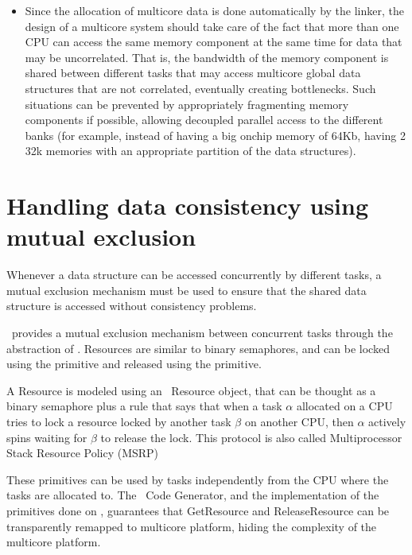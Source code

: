 \begin{itemize}
\item Since the allocation of multicore data is done
  automatically by the linker, the design of a multicore system
  should take care of the fact that more than one CPU can access the
  same memory component at the same time for data that may be
  uncorrelated. That is, the bandwidth of the memory component is
  shared between different tasks that may access multicore global
  data structures that are not correlated, eventually creating
  bottlenecks.  Such situations can be prevented by appropriately
  fragmenting memory components if possible, allowing decoupled
  parallel access to the different banks (for example, instead of
  having a big onchip memory of 64Kb, having 2 32k memories with an
  appropriate partition of the data structures).
\end{itemize}





\section{Handling data consistency using mutual exclusion}
\label{sec:altera-mutex}

Whenever a data structure can be accessed concurrently by different
tasks, a mutual exclusion mechanism must be used to ensure that the
shared data structure is accessed without consistency problems.

\ee\ provides a mutual exclusion mechanism between concurrent tasks
through the abstraction of . Resources are similar to
binary semaphores, and can be locked using the 
primitive and released using the  primitive.

A Resource is modeled using an \ee\ Resource object, that can be
thought as a binary semaphore plus a rule that says that when a task
$\alpha$ allocated on a CPU tries to lock a resource locked by another
task $\beta$ on another CPU, then $\alpha$ actively spins waiting for
$\beta$ to release the lock. This protocol is also called
Multiprocessor Stack Resource Policy (MSRP)
%
%
%
%
%

These primitives can be used by tasks independently from the CPU where
the tasks are allocated to. The \rtd\ Code Generator, and the
implementation of the primitives done on \ee, guarantees that
GetResource and ReleaseResource can be transparently remapped to
multicore platform, hiding the complexity of the multicore platform.


